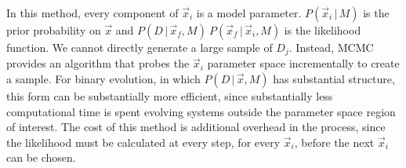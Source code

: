 \documentclass[12pt, preprint]{aastex}
\newcommand{\given}{\,|\,}
\newcommand{\dd}{\mathrm{d}}
\begin{document}
In this method, every component of $\vec{x}_i$ is a model parameter. $P(\vec{x}_i \given M)$ is the prior probability on $\vec{x}$ and $P(D \given \vec{x}_f, M)\ P(\vec{x}_f \given \vec{x}_i, M)$ is the likelihood function. We cannot directly generate a large sample of $D_j$. Instead, MCMC provides an algorithm that probes the $\vec{x}_i$ parameter space incrementally to create a sample. For binary evolution, in which $P(D \given \vec{x}, M)$ has substantial structure, this form can be substantially more efficient, since substantially less computational time is spent evolving systems outside the parameter space region of interest. The cost of this method is additional overhead in the process, since the likelihood must be calculated at every step, for every $\vec{x}_i$, before the next $\vec{x}_i$ can be chosen.

\end{document}
